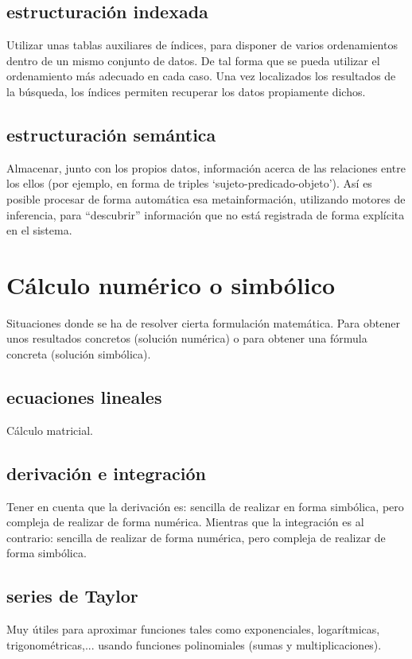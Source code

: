 \documentclass[spanish,12pt,a4paper,final,oneside]{book}
\begin{document}
\subsection{estructuración indexada}
Utilizar unas tablas auxiliares de índices, para disponer de varios ordenamientos dentro de un mismo conjunto de datos. De tal forma que se pueda utilizar el ordenamiento más adecuado en cada caso. Una vez localizados los resultados de la búsqueda, los índices permiten recuperar los datos propiamente dichos.

\subsection{estructuración semántica}
Almacenar, junto con los propios datos, información acerca de las relaciones entre los ellos (por ejemplo, en forma de triples `sujeto-predicado-objeto'). Así es posible procesar de forma automática esa metainformación, utilizando motores de inferencia, para ``descubrir'' información que no está registrada de forma explícita en el sistema.

\section{Cálculo numérico o simbólico}
Situaciones donde se ha de resolver cierta formulación matemática. Para obtener unos resultados concretos (solución numérica) o para obtener una fórmula concreta (solución simbólica).

\subsection{ecuaciones lineales}
Cálculo matricial.

\subsection{derivación e integración}
Tener en cuenta que la derivación es: sencilla de realizar en forma simbólica, pero compleja de realizar de forma numérica. Mientras que la integración es al contrario: sencilla de realizar de forma numérica, pero compleja de realizar de forma simbólica.

\subsection{series de Taylor}
Muy útiles para aproximar funciones tales como exponenciales, logarítmicas, trigonométricas,... usando funciones polinomiales (sumas y multiplicaciones).
\end{document}
